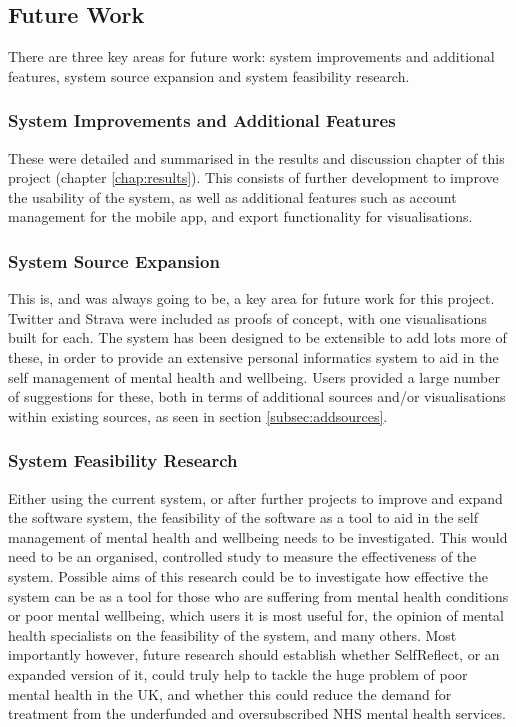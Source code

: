 \documentclass[11pt,openright,a4paper]{report}
\begin{document}
\subsection{Future Work}
There are three key areas for future work: system improvements and additional features, system source expansion and system feasibility research.

\subsubsection{System Improvements and Additional Features}
These were detailed and summarised in the results and discussion chapter of this project (chapter \ref{chap:results}). This consists of further development to improve the usability of the system, as well as additional features such as account management for the mobile app, and export functionality for visualisations.

\subsubsection{System Source Expansion}
This is, and was always going to be, a key area for future work for this project. Twitter and Strava were included as proofs of concept, with one visualisations built for each. The system has been designed to be extensible to add lots more of these, in order to provide an extensive personal informatics system to aid in the self management of mental health and wellbeing. Users provided a large number of suggestions for these, both in terms of additional sources and/or visualisations within existing sources, as seen in section \ref{subsec:addsources}.

\subsubsection{System Feasibility Research}
Either using the current system, or after further projects to improve and expand the software system, the feasibility of the software as a tool to aid in the self management of mental health and wellbeing needs to be investigated. This would need to be an organised, controlled study to measure the effectiveness of the system. Possible aims of this research could be to investigate how effective the system can be as a tool for those who are suffering from mental health conditions or poor mental wellbeing, which users it is most useful for, the opinion of mental health specialists on the feasibility of the system, and many others. Most importantly however, future research should establish whether SelfReflect, or an expanded version of it, could truly help to tackle the huge problem of poor mental health in the UK, and whether this could reduce the demand for treatment from the underfunded and oversubscribed NHS mental health services.
\end{document}
